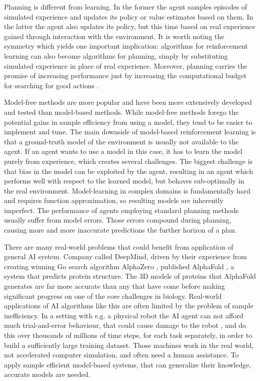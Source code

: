 Planning is different from learning. In the former the agent samples episodes of simulated experience and updates its policy or value estimates based on them. In the latter the agent also updates its policy, but this time based on real experience gained through interaction with the environment. It is worth noting the symmetry which yields one important implication: algorithms for reinforcement learning can also become algorithms for planning, simply by substituting simulated experience in place of real experience. Moreover, planning carries the promise of increasing performance just by increasing the computational budget for searching for good actions \cite{Algo.AlphaGoZero}.

Model-free methods are more popular and have been more extensively developed and tested than model-based methods. While model-free methods forego the potential gains in sample efficiency from using a model, they tend to be easier to implement and tune. The main downside of model-based reinforcement learning is that a ground-truth model of the environment is usually not available to the agent. If an agent wants to use a model in this case, it has to learn the model purely from experience, which creates several challenges. The biggest challenge is that bias in the model can be exploited by the agent, resulting in an agent which performs well with respect to the learned model, but behaves sub-optimally in the real environment. Model-learning in complex domains is fundamentally hard and requires function approximation, so resulting models are inherently imperfect. The performance of agents employing standard planning methods usually suffer from model errors. Those errors compound during planning, causing more and more inaccurate predictions the further horizon of a plan. 

There are many real-world problems that could benefit from application of general AI system. Company called DeepMind, driven by their experience from creating winning Go search algorithm AlphaZero \cite{Algo.AlphaZero}, published AlphaFold \cite{Algo.AlphaFold}, a system that predicts protein structure. The 3D models of proteins that AlphaFold generates are far more accurate than any that have come before making significant progress on one of the core challenges in biology. Real-world applications of AI algorithms like this are often limited by the problem of sample inefficiency. In a setting with e.g. a physical robot the AI agent can not afford much trial-and-error behaviour, that could cause damage to the robot , and do this over thousands of millions of time steps, for each task separately, in order to build a sufficiently large training dataset. Those machines work in the real world, not accelerated computer simulation, and often need a human assistance. To apply sample efficient model-based systems, that can generalize their knowledge, accurate models are needed.

